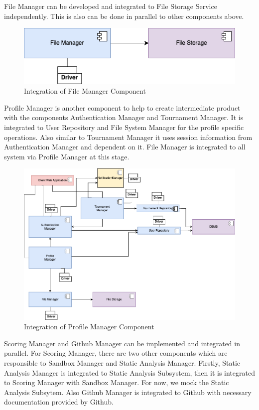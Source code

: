 \newpage
\indent File Manager can be developed and integrated to File Storage Service independently. This is also can be done in parallel to other components above. 

\begin{figure}[H]
    \centering
    \includegraphics[width=\linewidth]{Images/integration/integration_5.drawio.png}
    \caption{Integration of File Manager Component}
\end{figure}

\newpage
\indent Profile Manager is another component to help to create intermediate product with the components Authentication Manager and Tournament Manager. It is integrated to User Repository and File System Manager for the profile specific operations. Also similar to Tournament Manager it uses session information from Authentication Manager and dependent on it. File Manager is integrated to all system via Profile Manager at this stage.

\begin{figure}[H]
    \centering
    \includegraphics[width=\linewidth]{Images/integration/integration_6.drawio.png}
    \caption{Integration of Profile Manager Component}
\end{figure}

\newpage
\indent Scoring Manager and Github Manager can be implemented and integrated in parallel. For Scoring Manager, there are two other components which are responsible to Sandbox Manager and Static Analysis Manager. Firstly, Static Analysis Manager is integrated to Static Analysis Subsystem, then it is integrated to Scoring Manager with Sandbox Manager. For now, we mock the Static Analysis Subsytem. Also Github Manager is integrated to Github with necessary documentation provided by Github.

